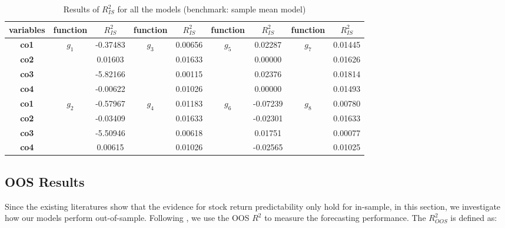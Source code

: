 \documentclass[a4paper,12pt,times,numbered,print,index]{report}
\numberwithin{equation}{section}
\begin{document}
	\begin{table}[!htbp]
		\centering
		\caption{Results of $R^2_{IS}$ for all the models (benchmark: sample mean model)}
		\begin{adjustbox}{max width=\textwidth}
			\begin{tabular}{ccccccccc}
				\toprule
				\textbf{variables} & \textbf{function} & \textbf{$R^2_{IS}$} & \textbf{function} & \textbf{$R^2_{IS}$} & \textbf{function} & \textbf{$R^2_{IS}$} & \textbf{function} & \textbf{$R^2_{IS}$} \\
				\midrule
				\textbf{co1} & \multirow{4}[1]{*}{\textbf{$g_1$}} & -0.37483 & \multirow{4}[1]{*}{\textbf{$g_3$}} & 0.00656 & \multirow{4}[1]{*}{\textbf{$g_5$}} & 0.02287 & \multirow{4}[1]{*}{\textbf{$g_7$}} & 0.01445 \\
				\textbf{co2} &       & 0.01603 &       & 0.01633 &       & 0.00000 &       & 0.01626 \\
				\textbf{co3} &       & -5.82166 &       & 0.00115 &       & 0.02376 &       & 0.01814 \\
				\textbf{co4} &       & -0.00622 &       & 0.01026 &       & 0.00000 &       & 0.01493 \\
				\midrule
				\textbf{co1} & \multirow{4}[1]{*}{\textbf{$g_2$}} & -0.57967 & \multirow{4}[1]{*}{\textbf{$g_4$}} & 0.01183 & \multirow{4}[1]{*}{\textbf{$g_6$}} & -0.07239 & \multirow{4}[1]{*}{\textbf{$g_8$}} & 0.00780 \\
				\textbf{co2} &       & -0.03409 &       & 0.01633 &       & -0.02301 &       & 0.01633 \\
				\textbf{co3} &       & -5.50946 &       & 0.00618 &       & 0.01751 &       & 0.00077 \\
				\textbf{co4} &       & 0.00615 &       & 0.01026 &       & -0.02565 &       & 0.01025 \\
				\bottomrule
				\bottomrule
			\end{tabular}%
		\end{adjustbox}
		\label{ins_R2}%
	\end{table}%
	
	
	\subsection{OOS Results}
	Since the existing literatures show that the evidence for stock return predictability only hold for in-sample, in this section, we investigate how our models perform out-of-sample. Following \cite{campbell2008predicting}, we use the OOS $R^2$ to measure the forecasting performance. The $R^2_{OOS}$ is defined as:
	
\end{document}
